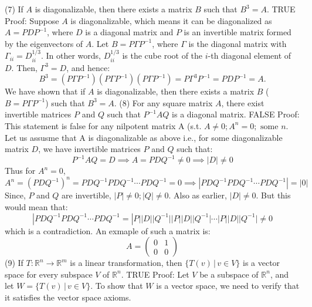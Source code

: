 \documentclass{article}
\begin{document}
(7) If \(A\) is diagonalizable, then there exists a matrix \(B\) such that \(B^3 = A\). TRUE
\newline
Proof: Suppose \(A\) is diagonalizable, which means it can be diagonalized as \(A = PDP^{-1}\), where \(D\) is a diagonal matrix and \(P\) is an invertible matrix formed by the eigenvectors of \(A\). Let \(B = P\Gamma P^{-1}\), where \(\Gamma\) is the diagonal matrix with \(\Gamma_{ii} = D_{ii}^{1/3}\). In other words, \(D_{ii}^{1/3}\) is the cube root of the \(i\)-th diagonal element of \(D\).
Then, \(\Gamma^3 = D\), and hence:
\[B^3 = (P\Gamma P^{-1})(P\Gamma P^{-1})(P\Gamma P^{-1}) = P\Gamma^3 P^{-1} = PD P^{-1} = A.\]
We have shown that if \(A\) is diagonalizable, then there exists a matrix \(B\) (\(B = P\Gamma P^{-1}\)) such that \(B^3 = A\).
\newline
\newline
(8) For any square matrix \(A\), there exist invertible matrices \(P\) and \(Q\) such that \(P^{-1}AQ\) is a diagonal matrix. FALSE
\newline
Proof: This statement is false for any nilpotent matrix A (s.t. $A \neq 0; A^n = 0; \text{ some } n $. Let us assusme that A is diagonalizable as above i.e., for some diagonalizable matrix $D$, we have invertible matrices $P$ and $Q$ such that:
$$P^{-1} A Q = D \implies A = P D Q^{-1} \neq 0 \implies |D| \neq 0$$
Thus for $A^n = 0$,
$$A^n = (P D Q^{-1})^n = P D Q^{-1} P D Q^{-1} \cdots P D Q^{-1} = 0 \implies |P D Q^{-1} P D Q^{-1} \cdots P D Q^{-1}| = |0|$$
Since, $P$ and $Q$ are invertible, $|P| \neq 0; |Q| \neq 0$. Also as earlier, $|D| \neq 0$. But this would mean that:
$$|P D Q^{-1} P D Q^{-1} \cdots P D Q^{-1} = |P| |D| |Q^{-1} ||P|| D|| Q^{-1} |\cdots |P|| D| |Q^{-1}| \neq 0$$
which is a contradiction. An exmaple of such a matrix is:
$$A = 
\left(\begin{array}{cc}
      0 & 1\\
      0 & 0
    \end{array}\right)$$
\newline
(9) If \(T : \mathbb{R}^n \rightarrow \mathbb{R}^m\) is a linear transformation, then \(\{T(v) \,|\, v \in V\}\) is a vector space for every subspace \(V\) of \(\mathbb{R}^n\). TRUE
\newline
Proof: Let \(V\) be a subspace of \(\mathbb{R}^n\), and let \(W = \{T(v) \,|\, v \in V\}\). To show that \(W\) is a vector space, we need to verify that it satisfies the vector space axioms.
\end{document}
